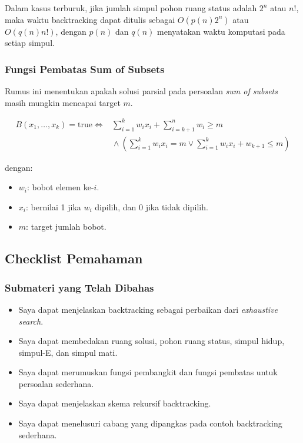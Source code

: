 Dalam kasus terburuk, jika jumlah simpul pohon ruang status adalah $2^n$ atau $n!$, maka waktu backtracking dapat ditulis sebagai $O(p(n)2^n)$ atau $O(q(n)n!)$, dengan $p(n)$ dan $q(n)$ menyatakan waktu komputasi pada setiap simpul.

\subsubsection{Fungsi Pembatas Sum of Subsets}

\begin{jawab}
Rumus ini menentukan apakah solusi parsial pada persoalan \textit{sum of subsets} masih mungkin mencapai target $m$.
\end{jawab}

\begin{equation}
    \begin{aligned}
    B(x_1,\ldots,x_k)=\text{true}
    \iff{}&
    \sum_{i=1}^{k} w_i x_i + \sum_{i=k+1}^{n} w_i \ge m \\
    &{}\land
    \left(\sum_{i=1}^{k} w_i x_i = m
    \lor
    \sum_{i=1}^{k} w_i x_i + w_{k+1} \le m\right)
    \end{aligned}
    \label{eq:sum-subsets-bound}
\end{equation}

dengan:
\begin{itemize}
    \item $w_i$: bobot elemen ke-$i$.
    \item $x_i$: bernilai 1 jika $w_i$ dipilih, dan 0 jika tidak dipilih.
    \item $m$: target jumlah bobot.
\end{itemize}

\subsection{Checklist Pemahaman}

\subsubsection{Submateri yang Telah Dibahas}
\begin{itemize}
    \item[$\square$] Saya dapat menjelaskan backtracking sebagai perbaikan dari \textit{exhaustive search}.
    \item[$\square$] Saya dapat membedakan ruang solusi, pohon ruang status, simpul hidup, simpul-E, dan simpul mati.
    \item[$\square$] Saya dapat merumuskan fungsi pembangkit dan fungsi pembatas untuk persoalan sederhana.
    \item[$\square$] Saya dapat menjelaskan skema rekursif backtracking.
    \item[$\square$] Saya dapat menelusuri cabang yang dipangkas pada contoh backtracking sederhana.
\end{itemize}

